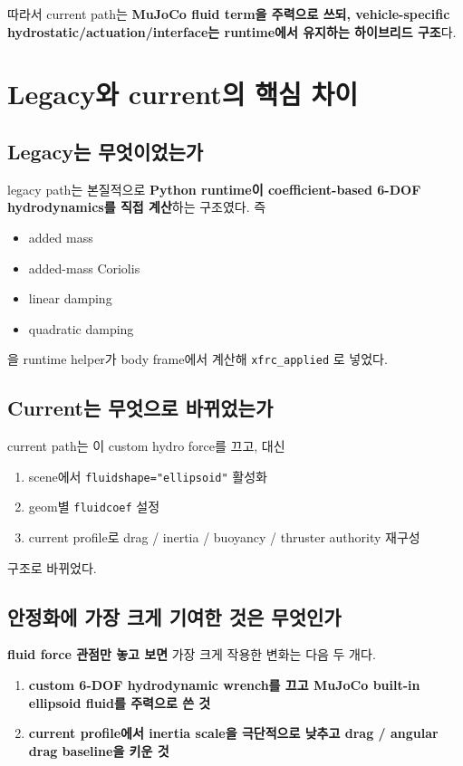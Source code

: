 \documentclass[11pt,a4paper]{article}
\newcommand{\code}[1]{\nolinkurl{#1}}
\begin{document}
따라서 current path는 \textbf{MuJoCo fluid term을 주력으로 쓰되, vehicle-specific hydrostatic/actuation/interface는 runtime에서 유지하는 하이브리드 구조}다.

\section{Legacy와 current의 핵심 차이}

\subsection{Legacy는 무엇이었는가}

legacy path는 본질적으로 \textbf{Python runtime이 coefficient-based 6-DOF hydrodynamics를 직접 계산}하는 구조였다. 즉

\begin{itemize}[leftmargin=2em]
  \item added mass
  \item added-mass Coriolis
  \item linear damping
  \item quadratic damping
\end{itemize}

을 runtime helper가 body frame에서 계산해 \code{xfrc\_applied} 로 넣었다.

\subsection{Current는 무엇으로 바뀌었는가}

current path는 이 custom hydro force를 끄고, 대신

\begin{enumerate}[leftmargin=2em]
  \item scene에서 \code{fluidshape="ellipsoid"} 활성화
  \item geom별 \code{fluidcoef} 설정
  \item current profile로 drag / inertia / buoyancy / thruster authority 재구성
\end{enumerate}

구조로 바뀌었다.

\subsection{안정화에 가장 크게 기여한 것은 무엇인가}

\textbf{fluid force 관점만 놓고 보면} 가장 크게 작용한 변화는 다음 두 개다.

\begin{enumerate}[leftmargin=2em]
  \item \textbf{custom 6-DOF hydrodynamic wrench를 끄고 MuJoCo built-in ellipsoid fluid를 주력으로 쓴 것}
  \item \textbf{current profile에서 inertia scale을 극단적으로 낮추고 drag / angular drag baseline을 키운 것}
\end{enumerate}
\end{document}
